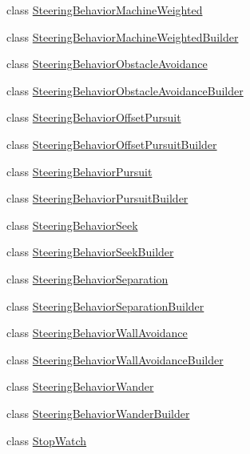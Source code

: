 \begin{DoxyCompactItemize}
class \mbox{\hyperlink{classnjli_1_1_steering_behavior_machine_weighted}{Steering\+Behavior\+Machine\+Weighted}}
\item 
class \mbox{\hyperlink{classnjli_1_1_steering_behavior_machine_weighted_builder}{Steering\+Behavior\+Machine\+Weighted\+Builder}}
\item 
class \mbox{\hyperlink{classnjli_1_1_steering_behavior_obstacle_avoidance}{Steering\+Behavior\+Obstacle\+Avoidance}}
\item 
class \mbox{\hyperlink{classnjli_1_1_steering_behavior_obstacle_avoidance_builder}{Steering\+Behavior\+Obstacle\+Avoidance\+Builder}}
\item 
class \mbox{\hyperlink{classnjli_1_1_steering_behavior_offset_pursuit}{Steering\+Behavior\+Offset\+Pursuit}}
\item 
class \mbox{\hyperlink{classnjli_1_1_steering_behavior_offset_pursuit_builder}{Steering\+Behavior\+Offset\+Pursuit\+Builder}}
\item 
class \mbox{\hyperlink{classnjli_1_1_steering_behavior_pursuit}{Steering\+Behavior\+Pursuit}}
\item 
class \mbox{\hyperlink{classnjli_1_1_steering_behavior_pursuit_builder}{Steering\+Behavior\+Pursuit\+Builder}}
\item 
class \mbox{\hyperlink{classnjli_1_1_steering_behavior_seek}{Steering\+Behavior\+Seek}}
\item 
class \mbox{\hyperlink{classnjli_1_1_steering_behavior_seek_builder}{Steering\+Behavior\+Seek\+Builder}}
\item 
class \mbox{\hyperlink{classnjli_1_1_steering_behavior_separation}{Steering\+Behavior\+Separation}}
\item 
class \mbox{\hyperlink{classnjli_1_1_steering_behavior_separation_builder}{Steering\+Behavior\+Separation\+Builder}}
\item 
class \mbox{\hyperlink{classnjli_1_1_steering_behavior_wall_avoidance}{Steering\+Behavior\+Wall\+Avoidance}}
\item 
class \mbox{\hyperlink{classnjli_1_1_steering_behavior_wall_avoidance_builder}{Steering\+Behavior\+Wall\+Avoidance\+Builder}}
\item 
class \mbox{\hyperlink{classnjli_1_1_steering_behavior_wander}{Steering\+Behavior\+Wander}}
\item 
class \mbox{\hyperlink{classnjli_1_1_steering_behavior_wander_builder}{Steering\+Behavior\+Wander\+Builder}}
\item 
class \mbox{\hyperlink{classnjli_1_1_stop_watch}{Stop\+Watch}}
\item 

\end{DoxyCompactItemize}
